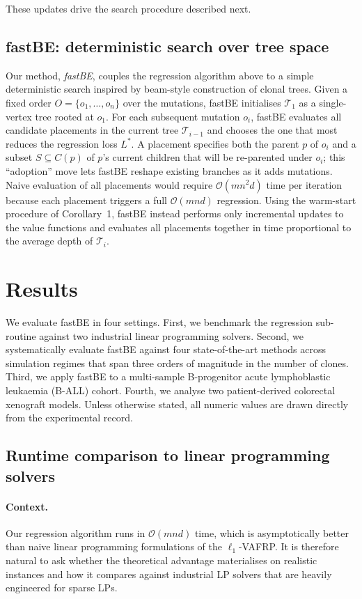 \documentclass[11pt]{article}
\begin{document}
These updates drive the search procedure described next.

\subsection{fastBE: deterministic search over tree space}

Our method, \emph{fastBE}, couples the regression algorithm above to a simple deterministic search inspired by beam-style construction of clonal trees. Given a fixed order $O = \{o_1,\ldots,o_n\}$ over the mutations, fastBE initialises $\mathcal{T}_1$ as a single-vertex tree rooted at $o_1$. For each subsequent mutation $o_i$, fastBE evaluates all candidate placements in the current tree $\mathcal{T}_{i-1}$ and chooses the one that most reduces the regression loss $L^*$. A placement specifies both the parent $p$ of $o_i$ and a subset $S\subseteq C(p)$ of $p$'s current children that will be re-parented under $o_i$; this ``adoption'' move lets fastBE reshape existing branches as it adds mutations. Naive evaluation of all placements would require $\mathcal{O}(mn^2 d)$ time per iteration because each placement triggers a full $\mathcal{O}(mnd)$ regression. Using the warm-start procedure of Corollary~1, fastBE instead performs only incremental updates to the value functions and evaluates all placements together in time proportional to the average depth of $\mathcal{T}_i$.

\section{Results}
\label{sec:results}

We evaluate fastBE in four settings. First, we benchmark the regression sub-routine against two industrial linear programming solvers. Second, we systematically evaluate fastBE against four state-of-the-art methods across simulation regimes that span three orders of magnitude in the number of clones. Third, we apply fastBE to a multi-sample B-progenitor acute lymphoblastic leukaemia (B-ALL) cohort. Fourth, we analyse two patient-derived colorectal xenograft models. Unless otherwise stated, all numeric values are drawn directly from the experimental record.

\subsection{Runtime comparison to linear programming solvers}

\paragraph{Context.}
Our regression algorithm runs in $\mathcal{O}(mnd)$ time, which is asymptotically better than naive linear programming formulations of the $\ell_1$-VAFRP. It is therefore natural to ask whether the theoretical advantage materialises on realistic instances and how it compares against industrial LP solvers that are heavily engineered for sparse LPs.
\end{document}

